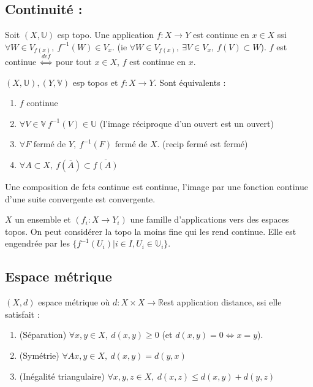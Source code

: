 \subsection{ Continuité :}
\begin{definition}
	Soit $(X,\mathbb{U})$ esp topo. Une application $f:X\to Y$ est continue en $x\in X$ ssi $\forall W\in V_{f(x)}, \ f^{-1}(W)\in V_x$. (ie $\forall W\in V_{f(x)},\ \exists V\in V_x,\ f(V)\subset W$). $f$ est continue $\overset{def}{\Leftrightarrow }$ pour tout $x\in X$, $f$ est continue en $x$. \\

\end{definition}
\begin{definition}
	 $(X,\mathbb{U}), (Y,\mathbb{V})$ esp topos et $f:X\to Y$. Sont équivalents :
    \begin{enumerate}
        \item $f$ continue
        \item $\forall V\in \mathbb{V}\ f^{-1}(V)\in \mathbb{U}$ (l'image réciproque d'un ouvert est un ouvert)
        \item $\forall F\text{ fermé de }Y,\ f^{-1}(F) \text{ fermé de }X$. (recip fermé est fermé)
        \item $\forall A\subset X,\ f(\overline{A})\subset \overline{f(A)}$
    \end{enumerate}
Une composition de fcts continue est continue, l'image par une fonction continue d'une suite convergente est convergente.\\

\end{definition}
\begin{ex}
	 $X$ un ensemble et $(f_i:X\to Y_i)$ une famille d'applications vers des espaces topos. On peut considérer la topo la moins fine qui les rend continue. Elle est engendrée par les $\{f^{-1}(U_i)|i\in I, U_i\in \mathbb{U}_i\}$.

\end{ex}

\subsection{Espace métrique}
\begin{definition}
    $(X,d)$ espace métrique où $d:X\times X\to \mathbb{R} $est application distance, ssi elle satisfait :
    \begin{enumerate}
        \item(Séparation) $\forall x,y\in X,\ d(x,y)\ge 0$ (et $d(x,y)=0\Leftrightarrow x=y$).
        \item (Symétrie) $\forall Ax,y\in X,\ d(x,y)=d(y,x)$
        \item (Inégalité triangulaire) $\forall x,y,z\in X,\ d(x,z)\le d(x,y)+d(y,z)$
    \end{enumerate}
\end{definition}

